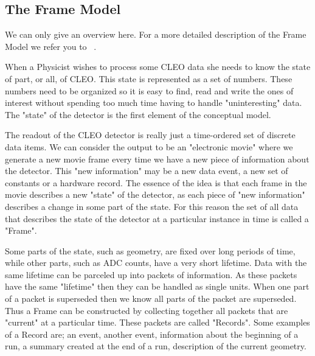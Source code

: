 \documentclass[12pt]{article}
\begin{document}

\subsection{The Frame Model}

We can only give an overview here. For a more detailed description of the
Frame Model we refer you to ~\cite{Delivery}.

When a Physicist wishes to process some CLEO data she
needs to know the state of part, or all, of CLEO. This state is
represented as a set of numbers. These numbers need to be organized so
it is easy to find, read and write the ones of interest without spending
too much time having to handle "uninteresting" data. The "state" of the
detector is the first element of the conceptual model.
 
The readout of the CLEO detector is really just a time-ordered set of
discrete data items. We can consider the output to be an "electronic
movie" where we generate a new movie frame every time we have a new
piece of information about the detector. This "new information" may be a
new data event, a new set of constants or a hardware record. The
essence of the idea is that each frame in the movie describes a new
"state" of the detector, as each piece of "new information" describes a
change in some part of the state. For this reason the set of all data
that describes the state of the detector at a particular instance in
time is called a "Frame".

Some parts of the state, such as geometry, are fixed over long periods
of time, while other parts, such as ADC counts, have a very short
lifetime.  Data with the same lifetime can be parceled up into packets
of information. As these packets have the same "lifetime" then they can
be handled as single units. When one part of a packet is superseded then
we know all parts of the packet are superseded. Thus a
Frame can be constructed by collecting together all packets
that are "current" at a particular time. These packets are called
"Records". Some examples of a Record are; an event,
another event, information about the beginning of a run, a summary
created at the end of a run, description of the current geometry.
\end{document}

